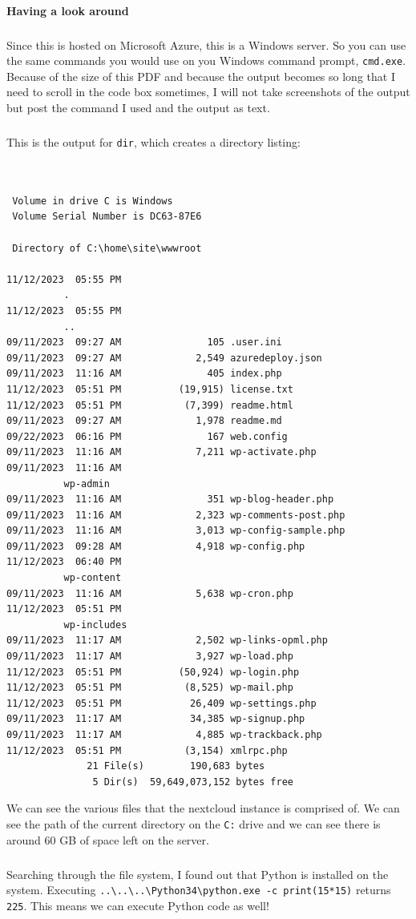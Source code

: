 \documentclass[12pt, a4paper]{article}
\begin{document}
		\paragraph{Having a look around}
			\subparagraph{}
				Since this is hosted on Microsoft Azure, this is a Windows server. So you can use the same commands you would use on you Windows command prompt, \texttt{cmd.exe}. Because of the size of this PDF and because the output becomes so long that I need to scroll in the code box sometimes, I will not take screenshots of the output but post the command I used and the output as text.
			\subparagraph{}
				\newpage
				This is the output for \texttt{dir}, which creates a directory listing:
				\begin{lstlisting}[style=mylisting]


 Volume in drive C is Windows
 Volume Serial Number is DC63-87E6

 Directory of C:\home\site\wwwroot

11/12/2023  05:55 PM    
          .
11/12/2023  05:55 PM    
          ..
09/11/2023  09:27 AM               105 .user.ini
09/11/2023  09:27 AM             2,549 azuredeploy.json
09/11/2023  11:16 AM               405 index.php
11/12/2023  05:51 PM          (19,915) license.txt
11/12/2023  05:51 PM           (7,399) readme.html
09/11/2023  09:27 AM             1,978 readme.md
09/22/2023  06:16 PM               167 web.config
09/11/2023  11:16 AM             7,211 wp-activate.php
09/11/2023  11:16 AM    
          wp-admin
09/11/2023  11:16 AM               351 wp-blog-header.php
09/11/2023  11:16 AM             2,323 wp-comments-post.php
09/11/2023  11:16 AM             3,013 wp-config-sample.php
09/11/2023  09:28 AM             4,918 wp-config.php
11/12/2023  06:40 PM    
          wp-content
09/11/2023  11:16 AM             5,638 wp-cron.php
11/12/2023  05:51 PM    
          wp-includes
09/11/2023  11:17 AM             2,502 wp-links-opml.php
09/11/2023  11:17 AM             3,927 wp-load.php
11/12/2023  05:51 PM          (50,924) wp-login.php
11/12/2023  05:51 PM           (8,525) wp-mail.php
11/12/2023  05:51 PM            26,409 wp-settings.php
09/11/2023  11:17 AM            34,385 wp-signup.php
09/11/2023  11:17 AM             4,885 wp-trackback.php
11/12/2023  05:51 PM           (3,154) xmlrpc.php
              21 File(s)        190,683 bytes
               5 Dir(s)  59,649,073,152 bytes free
				\end{lstlisting}
				We can see the various files that the nextcloud instance is comprised of. We can see the path of the current directory on the \texttt{C:} drive and we can see there is around 60 GB of space left on the server.
			\subparagraph{}
				Searching through the file system, I found out that Python is installed on the system. Executing \texttt{..\textbackslash..\textbackslash..\textbackslash Python34\textbackslash python.exe -c print(15*15)} returns \texttt{225}. This means we can execute Python code as well!
\end{document}
